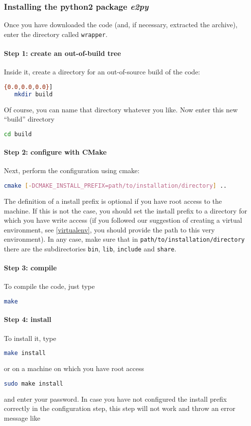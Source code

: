 \documentclass[american,11pt]{article}
\def\code#1{\texttt{#1}}
\begin{document}
\subsubsection{Installing the python2 package \textit{e2py}}
Once you have downloaded the code (and, if necessary, extracted the archive), enter the directory called \code{wrapper}. 

\paragraph{Step 1: create an out-of-build tree}
Inside it, create a directory for an out-of-source build of the code:

\begin{lstlisting}[language=bash, commentstyle=\color[rgb]{0.0,0.0,0.0}]
   mkdir build
\end{lstlisting}
Of course, you can name that directory whatever you like. Now enter this new ``build'' directory

\begin{lstlisting}[language=bash]
   cd build
\end{lstlisting}

\paragraph{Step 2: configure with CMake}
Next, perform the configuration using cmake:
\begin{lstlisting}[language=bash]
   cmake [-DCMAKE_INSTALL_PREFIX=path/to/installation/directory] ..
\end{lstlisting}
The definition of a install prefix is optional if you have root access to the machine. If this is not the case, you should set the install prefix to a directory for which you have write access (if you followed our suggestion of creating a virtual environment, see \autoref{virtualenv}, you should provide the path to this very environment). In any case, make sure that in \code{path/to/installation/directory} there are the subdirectories \code{bin}, \code{lib}, \code{include} and \code{share}.

\paragraph{Step 3: compile}
To compile the code, just type
\begin{lstlisting}[language=bash]
   make
\end{lstlisting}

\paragraph{Step 4: install}
To install it, type
\begin{lstlisting}[language=bash]
   make install
\end{lstlisting}
or on a machine on which you have root access
\begin{lstlisting}[language=bash]
   sudo make install
\end{lstlisting}
and enter your password. In case you have not configured the install prefix correctly in the configuration step, this step will not work and throw an error message like
\end{document}
